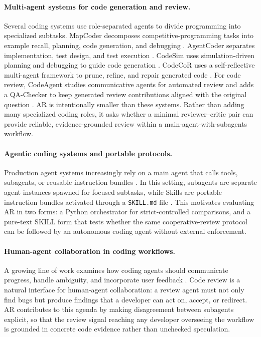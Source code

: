 \documentclass{article}
\begin{document}
\paragraph{Multi-agent systems for code generation and review.}
Several coding systems use role-separated agents to divide programming into specialized subtasks. MapCoder decomposes competitive-programming tasks into example recall, planning, code generation, and debugging \citep{mapcoder}. AgentCoder separates implementation, test design, and test execution \citep{agentcoder}. CodeSim uses simulation-driven planning and debugging to guide code generation \citep{codesim}. CodeCoR uses a self-reflective multi-agent framework to prune, refine, and repair generated code \citep{codecor}. For code review, CodeAgent studies communicative agents for automated review and adds a QA-Checker to keep generated review contributions aligned with the original question \citep{codeagent}. AR is intentionally smaller than these systems. Rather than adding many specialized coding roles, it asks whether a minimal reviewer--critic pair can provide reliable, evidence-grounded review within a main-agent-with-subagents workflow.

\paragraph{Agentic coding systems and portable protocols.}
Production agent systems increasingly rely on a main agent that calls tools, subagents, or reusable instruction bundles \citep{anthropic-agents}. In this setting, subagents are separate agent instances spawned for focused subtasks, while Skills are portable instruction bundles activated through a \texttt{SKILL.md} file \citep{anthropic2026subagents,anthropic2025skills}. This motivates evaluating AR in two forms: a Python orchestrator for strict-controlled comparisons, and a pure-text SKILL form that tests whether the same cooperative-review protocol can be followed by an autonomous coding agent without external enforcement. 

\paragraph{Human-agent collaboration in coding workflows.}
A growing line of work examines how coding agents should communicate progress, handle ambiguity, and incorporate user feedback \citep{codereviewer2022, swe-prbench2026}. Code review is a natural interface for human-agent collaboration: a review agent must not only find bugs but produce findings that a developer can act on, accept, or redirect. AR contributes to this agenda by making disagreement between subagents explicit, so that the review signal reaching any developer overseeing the workflow is grounded in concrete code evidence rather than unchecked speculation.
\end{document}

